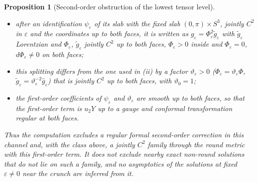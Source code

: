 \documentclass[11pt]{article}
\theoremstyle{canonmath}
\theoremstyle{canonpostulate}
\theoremstyle{canonproposition}
\theoremstyle{canonmath}
\newtheorem{proposition*}[theorem]{Proposition}
\theoremstyle{canonproposition}
\begin{document}
\begin{proposition*}[Second-order obstruction of the lowest tensor level]
\begin{enumerate}[label=(\roman*)]
\begin{itemize}
\item after an identification $\psi_\varepsilon$ of its slab with the fixed slab $(0,\pi)\times S^3$, jointly $C^2$ in $\varepsilon$ and the coordinates up to both faces, it is written as $g_\varepsilon = \Phi_\varepsilon^2\tilde g_\varepsilon$ with $\tilde g_\varepsilon$ Lorentzian and $\Phi_\varepsilon$, $\tilde g_\varepsilon$ jointly $C^2$ up to both faces, $\Phi_\varepsilon>0$ inside and $\Phi_\varepsilon = 0$, $d\Phi_\varepsilon\neq0$ on both faces;
\item this splitting differs from the one used in (ii) by a factor $\vartheta_\varepsilon>0$ ($\Phi_\varepsilon = \vartheta_\varepsilon\Phi$, $\tilde g_\varepsilon = \vartheta_\varepsilon^{-2}\hat g_\varepsilon$) that is jointly $C^2$ up to both faces, with $\vartheta_0 = 1$;
\item the first-order coefficients of $\psi_\varepsilon$ and $\vartheta_\varepsilon$ are smooth up to both faces, so that the first-order term is $u_2Y$ up to a gauge and conformal transformation regular at both faces.
\end{itemize}
Thus the computation excludes a regular formal second-order correction in this channel and, with the class above, a jointly $C^2$ family through the round metric with this first-order term. It does not exclude nearby exact non-round solutions that do not lie on such a family, and no asymptotics of the solutions at fixed $\varepsilon\neq0$ near the crunch are inferred from it.
\end{enumerate}
\end{proposition*}
\end{document}
